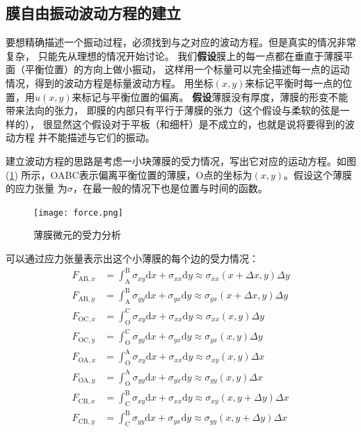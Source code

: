\documentclass[a4paper]{ctexart}
\def\d{\mathrm{d}}
\newcommand{\mr}[1]{\mathrm{#1}}
\begin{document}
	\subsection{膜自由振动波动方程的建立}
	要想精确描述一个振动过程，必须找到与之对应的波动方程。但是真实的情况非常复杂，
	只能先从理想的情况开始讨论。
	我们\textbf{假设}膜上的每一点都在垂直于薄膜平面（平衡位置）的方向上做小振动，
	这样用一个标量可以完全描述每一点的运动情况，得到的波动方程是标量波动方程。
	用坐标$(x, y)$来标记平衡时每一点的位置，用$u(x, y)$来标记与平衡位置的偏离。
	\textbf{假设}薄膜没有厚度，薄膜的形变不能带来法向的张力，
	即膜的内部只有平行于薄膜的张力（这个假设与柔软的弦是一样的），
	很显然这个假设对于平板（和细杆）是不成立的，也就是说将要得到的波动方程
	并不能描述与它们的振动。
	\par 建立波动方程的思路是考虑一小块薄膜的受力情况，写出它对应的运动方程。如图(\ref{force})
	所示，OABC表示偏离平衡位置的薄膜，O点的坐标为$(x, y)$。假设这个薄膜的应力张量
	为$\sigma$，在最一般的情况下也是位置与时间的函数。
	\begin{figure}[htbp]
		\centering
		\texttt{[image: force.png]}
		\caption{薄膜微元的受力分析}
		\label{force}
	\end{figure} 
	可以通过应力张量表示出这个小薄膜的每个边的受力情况：
	\begin{align}
		F_{\mr{AB}, x} &= \int_{\mr{A}}^{\mr{B}} \sigma_{xy}\d x + \sigma_{xx}\d y \approx \sigma_{xx}(x+\Delta x, y)\Delta y\\
		F_{\mr{AB}, y} &= \int_{\mr{A}}^{\mr{B}} \sigma_{yy}\d x + \sigma_{yx}\d y \approx \sigma_{yx}(x+\Delta x, y)\Delta y\\
		F_{\mr{OC}, x} &= \int_{\mr{O}}^{\mr{C}} \sigma_{xy}\d x + \sigma_{xx}\d y \approx \sigma_{xx}(x, y)\Delta y\\
		F_{\mr{OC}, y} &= \int_{\mr{O}}^{\mr{C}} \sigma_{yy}\d x + \sigma_{yx}\d y \approx \sigma_{yx}(x, y)\Delta y\\
		F_{\mr{OA}, x} &= \int_{\mr{O}}^{\mr{A}} \sigma_{xy}\d x + \sigma_{xx}\d y \approx \sigma_{xy}(x, y)\Delta x\\
		F_{\mr{OA}, y} &= \int_{\mr{O}}^{\mr{A}} \sigma_{yy}\d x + \sigma_{yx}\d y \approx \sigma_{yy}(x, y)\Delta x\\
		F_{\mr{CB}, x} &= \int_{\mr{C}}^{\mr{B}} \sigma_{xy}\d x + \sigma_{xx}\d y \approx \sigma_{xy}(x, y + \Delta y)\Delta x\\
		F_{\mr{CB}, y} &= \int_{\mr{C}}^{\mr{B}} \sigma_{yy}\d x + \sigma_{yx}\d y \approx \sigma_{yy}(x, y + \Delta y)\Delta x
	\end{align}
\end{document}
